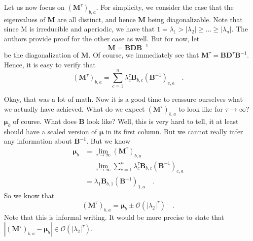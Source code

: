 \documentclass[../../main.tex]{subfiles}
\begin{document}
    Let us now focus on $(\boldsymbol{M}^{\tau})_{b,a}$. For simplicity, we consider the case that the eigenvalues of $\boldsymbol{M}$ are all distinct, and hence $\boldsymbol{M}$ being diagonalizable. Note that since M is irreducible and aperiodic, we have that $1 = \lambda_1 > |\lambda_2| \geq \dots \geq |\lambda_n|$. The authors provide proof for the other case as well. But for now, let
    \[
        \boldsymbol{M} = \boldsymbol{BDB}^{-1}
    \]
    be the diagonalization of $\boldsymbol{M}$. Of course, we immediately see that $\boldsymbol{M}^\tau = \boldsymbol{BD}^\tau \boldsymbol{B}^{-1}$. Hence, it is easy to verify that
    \[
        (\boldsymbol{M}^\tau)_{b,a} = \sum_{c = 1}^{n} \lambda_c^\tau \boldsymbol{B}_{b,c}(\boldsymbol{B}^{-1})_{c,a} \quad .
    \]

    \bigskip \noindent
    Okay, that was a lot of math. Now it is a good time to reassure ourselves what we actually have achieved. What do we expect $(\boldsymbol{M}^\tau)_{b,a}$ to look like for $\tau \rightarrow \infty$? $\boldsymbol{\mu}_b$ of course. What does $\boldsymbol{B}$ look like? Well, this is very hard to tell, it at least should have a scaled version of $\boldsymbol{\mu}$ in its first column. But we cannot really infer any information about $\boldsymbol{B}^{-1}$. But we know
    \begin{align*}
        \boldsymbol{\mu}_b &= \lim_{\tau \to \infty} (\boldsymbol{M}^\tau)_{b,a} \\
        &= \lim_{\tau \to \infty} \sum_{c = 1}^{n} \lambda_c^\tau \boldsymbol{B}_{b,c}(\boldsymbol{B}^{-1})_{c,a} \\
        &= \lambda_1 \boldsymbol{B}_{b,1}(\boldsymbol{B}^{-1})_{1,a} \quad .
    \end{align*}
    So we know that
    \[
        (\boldsymbol{M}^\tau)_{b,a} = \boldsymbol{\mu}_b \pm \mathcal{O}(|\lambda_2|^\tau) \quad .
    \]
    Note that this is informal writing. It would be more precise to state that $|(\boldsymbol{M}^\tau)_{b,a} - \boldsymbol{\mu}_b| \in \mathcal{O}(|\lambda_2|^\tau)$.
\end{document}
